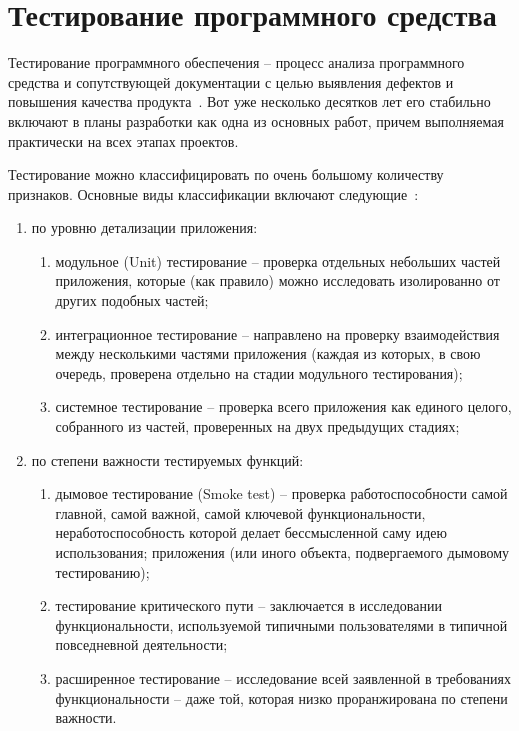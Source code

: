 \section{Тестирование программного средства}
\label{sec:testing}

Тестирование программного обеспечения -- процесс анализа программного средства и сопутствующей документации с целью выявления дефектов и повышения качества продукта~\cite{kulikov_testing}.
Вот уже несколько десятков лет его стабильно включают в планы разработки как одна из основных работ, причем выполняемая практически на всех этапах проектов.

Тестирование можно классифицировать по очень большому количеству признаков. Основные виды классификации включают следующие~\cite{kulikov_testing}:

\begin{enumerate}
    \item по уровню детализации приложения:
    \begin{enumerate}
        \item модульное (Unit) тестирование -- проверка отдельных небольших частей приложения, которые (как правило) можно исследовать изолированно от других подобных частей;
        \item интеграционное тестирование -- направлено на проверку взаимодействия между несколькими частями приложения (каждая из которых, в свою очередь, проверена отдельно на стадии модульного тестирования);
        \item системное тестирование -- проверка всего приложения как единого целого, собранного из частей, проверенных на двух предыдущих стадиях;
    \end{enumerate}
    \item по степени важности тестируемых функций:
    \begin{enumerate}
        \item дымовое тестирование (Smoke test) -- проверка работоспособности самой главной, самой важной, самой ключевой функциональности, неработоспособность которой делает бессмысленной саму идею использования; приложения (или иного объекта, подвергаемого дымовому тестированию);
        \item тестирование критического пути -- заключается в исследовании функциональности, используемой типичными пользователями в типичной повседневной деятельности;
        \item расширенное тестирование -- исследование всей заявленной в требованиях функциональности -- даже той, которая низко проранжирована по степени важности.
    \end{enumerate}
\end{enumerate}

